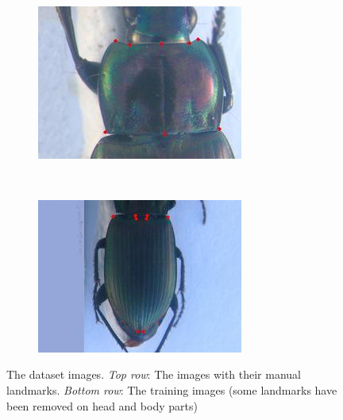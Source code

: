 \documentclass[10pt]{article}
\begin{document}
\begin{figure}[htbp]
\begin{subfigure}[t]{0.156\textwidth}
    \end{subfigure}%
    ~ 
    \begin{subfigure}[t]{0.156\textwidth}
        \centering
        \includegraphics[scale=0.4]{images/fpronotum}
    \end{subfigure}~
	\begin{subfigure}[t]{0.156\textwidth}
        \centering
        \includegraphics[scale=0.4]{images/felytre2}
    \end{subfigure}    
    \caption{The dataset images. \textit{Top row}: The images with their manual landmarks. \textit{Bottom row}: The training images (some landmarks have been removed on head and body parts) } 
    \label{figshape3parts}
\end{figure}
\end{document}
